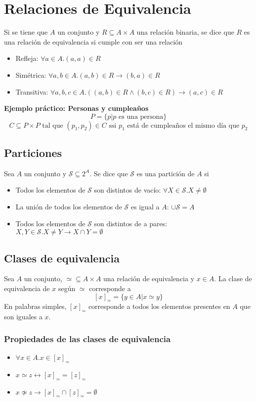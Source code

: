\documentclass[../main.tex]{subfiles}
\begin{document}
\section{Relaciones de Equivalencia}
Si se tiene que $A$ un conjunto y $R \subseteq A \times A$ una relación binaria, se dice que $R$ es una relación de equivalencia si cumple con ser una relación
\begin{itemize}
    \item Refleja: $\forall a \in A . (a,a) \in R$
    \item Simétrica: $\forall a, b \in A . (a,b) \in R \rightarrow (b,a) \in R$
    \item Transitiva: $\forall a, b, c \in A . ((a,b) \in R \wedge (b,c) \in R) \rightarrow (a,c) \in R$
\end{itemize}

\textbf{Ejemplo práctico: Personas y cumpleaños}
\[ P = \{ p | p \text{ es una persona} \} \]
\[ C \subseteq P \times P \text{ tal que } (p_1, p_2) \in C \text{ ssi } p_1 \text{ está de cumpleaños el mismo día que } p_2 \]

\subsection{Particiones}
Sea $A$ un conjunto y $\mathcal{S} \subseteq 2^A$. Se dice que $\mathcal{S}$ es una partición de $A$ si
\begin{itemize}
    \item Todos los elementos de $\mathcal{S}$ son distintos de vacío: $\forall X \in \mathcal{S} . X \not= \emptyset$
    \item La unión de todos los elementos de $\mathcal{S}$ es igual a $A$: $\cup \mathcal{S} = A$
    \item Todos los elementos de $\mathcal{S}$ son distintos de a pares: $X, Y \in \mathcal{S} . X \not= Y \rightarrow X \cap Y = \emptyset$
\end{itemize}

\subsection{Clases de equivalencia}
Sea $A$ un conjunto, $\simeq \subseteq A \times A$ una relación de equivalencia y $x \in A$. La clase de equivalencia de $x$ según $\simeq$ corresponde a
\[ [x]_\simeq = \{ y \in A | x \simeq y \} \]
En palabras simples, $[x]_\simeq$ corresponde a todos los elementos presentes en $A$ que son iguales a $x$.

\subsubsection{Propiedades de las clases de equivalencia}
\begin{itemize}
    \item $\forall x \in A . x \in [x]_\simeq$
    \item $x \simeq z \leftrightarrow [x]_\simeq = [z]_\simeq$
    \item $x \not\simeq z \rightarrow [x]_\simeq \cap [z]_\simeq = \emptyset$
\end{itemize}
\end{document}
